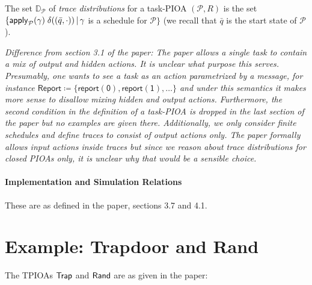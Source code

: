 \documentclass[10pt]{article}
\begin{document}
 The set $\mathbb{D}_\mathcal{P}$ of \emph{trace distributions} for a task-PIOA $(\mathcal{P},R)$ is the set $\{ \mathsf{apply}_\mathcal{P}(\gamma) \; \delta((\bar{q},\cdot)) \, | \, \gamma$ is a schedule for $\mathcal{P}\}$ (we recall that $\bar{q}$ is the start state of $\mathcal{P}$). 

\medskip
{\small \em Difference from section 3.1 of the paper: The paper allows a single task to contain a mix of output and hidden actions. It is unclear what purpose this serves. Presumably, one wants to see a task as an action parametrized by a message, for instance $\mathsf{Report} \coloneqq \{\mathsf{report(0)},\mathsf{report(1)}, \ldots\}$ and under this semantics it makes more sense to disallow mixing hidden and output actions. Furthermore, the second condition in the definition of a task-PIOA is dropped in the last section of the paper but no examples are given there. Additionally, we only consider finite schedules and define traces to consist of output actions only. The paper formally allows input actions inside traces but since we reason about trace distributions for \emph{closed} PIOAs only, it is unclear why that would be a sensible choice.}

\paragraph{Implementation and Simulation Relations}
These are as defined in the paper, sections 3.7 and 4.1.




\section{Example: Trapdoor and Rand}
The TPIOAs $\mathsf{Trap}$ and $\mathsf{Rand}$ are as given in the paper:
\end{document}
